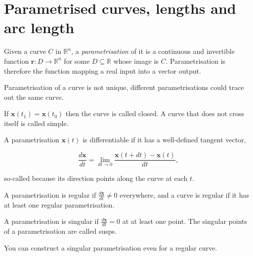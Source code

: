 \section{Parametrised curves, lengths and arc length}

\begin{ndefi}[Parametrisation]
	Given a curve $C$ in $\mathbb{R}^n$, a \emph{parametrisation} of it is a continuous and invertible function $\mathbf{r}: D \rightarrow \mathbb{R}^n$ for some $D \subseteq \mathbb{R}$ whose image is $C$. Parametrisation is therefore the function mapping a real input into a vector output.
\end{ndefi}

\begin{remark}
  Parametrisation of a curve is not unique, different parametrisations could trace out the same curve.  
\end{remark}

\begin{definition}
  If $\boldsymbol{x}\left(t_1\right)=\boldsymbol{x}\left(t_0\right)$ then the curve is called closed. A curve that does not cross itself is called simple.
\end{definition}

\begin{ndefi}
	A parametrisation $\boldsymbol{x}(t)$ is differentiable if it has a well-defined tangent vector,
	
	$$
	\frac{d \boldsymbol{x}}{d t}=\lim _{d t \rightarrow 0} \frac{\boldsymbol{x}(t+d t)-\boldsymbol{x}(t)}{d t},
	$$
	
	so-called because its direction points along the curve at each $t$.
\end{ndefi}

\begin{ndefi}
	A parametrisation is regular if $\frac{d \boldsymbol{x}}{d t} \neq 0$ everywhere, and a curve is regular if it has at least one regular parametrisation.
\end{ndefi}

\begin{ndefi}
	
	A parametrisation is singular if $\frac{d \boldsymbol{x}}{d t} = 0$ at at least one point. The singular points of a parametrisation are called susps.
	
\end{ndefi}

\begin{nrem}
	You can construct a singular parametrisation even for a regular curve.
\end{nrem}


